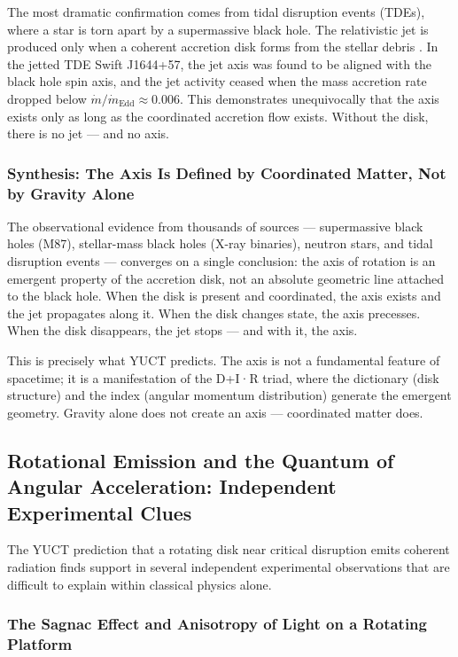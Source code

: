 \documentclass[12pt,a4paper]{article}
\begin{document}
	The most dramatic confirmation comes from tidal disruption events (TDEs), where a star is torn apart by a supermassive black hole. The relativistic jet is produced only when a coherent accretion disk forms from the stellar debris \cite{TDE2016,TDE2020}. In the jetted TDE Swift J1644+57, the jet axis was found to be aligned with the black hole spin axis, and the jet activity ceased when the mass accretion rate dropped below \(\dot{m}/\dot{m}_{\text{Edd}} \approx 0.006\). This demonstrates unequivocally that the axis exists only as long as the coordinated accretion flow exists. Without the disk, there is no jet — and no axis.
	
	\subsubsection{Synthesis: The Axis Is Defined by Coordinated Matter, Not by Gravity Alone}
	
	The observational evidence from thousands of sources — supermassive black holes (M87), stellar-mass black holes (X-ray binaries), neutron stars, and tidal disruption events — converges on a single conclusion: the axis of rotation is an emergent property of the accretion disk, not an absolute geometric line attached to the black hole. When the disk is present and coordinated, the axis exists and the jet propagates along it. When the disk changes state, the axis precesses. When the disk disappears, the jet stops — and with it, the axis.
	
	This is precisely what YUCT predicts. The axis is not a fundamental feature of spacetime; it is a manifestation of the D+I·R triad, where the dictionary (disk structure) and the index (angular momentum distribution) generate the emergent geometry. Gravity alone does not create an axis — coordinated matter does.

\subsection{Rotational Emission and the Quantum of Angular Acceleration: Independent Experimental Clues}

The YUCT prediction that a rotating disk near critical disruption emits coherent radiation finds support in several independent experimental observations that are difficult to explain within classical physics alone.

\subsubsection{The Sagnac Effect and Anisotropy of Light on a Rotating Platform}
\end{document}
